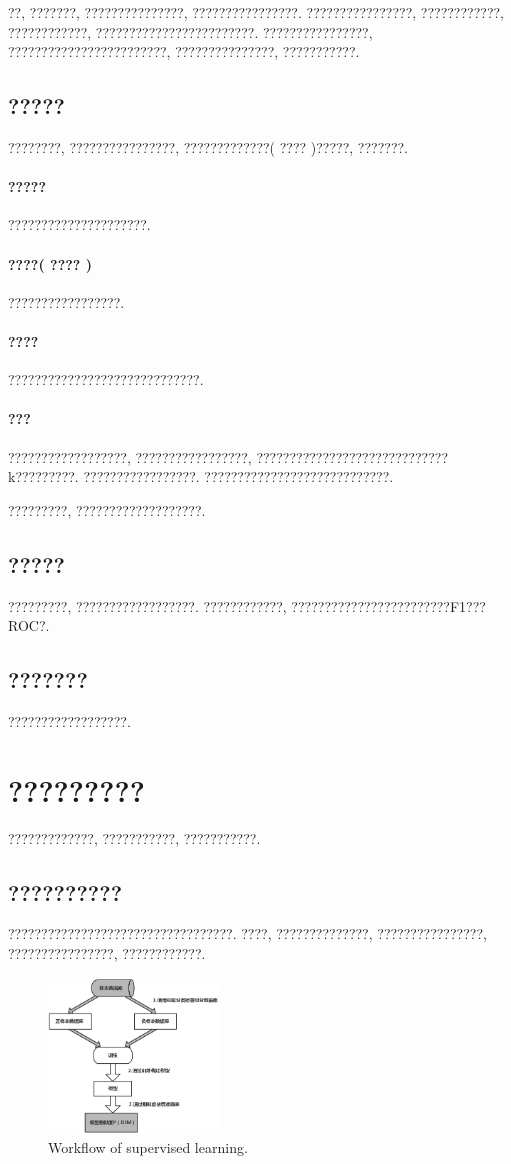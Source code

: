 \documentclass[lang=cn,11pt,a4paper]{elegantpaper}
\begin{document}
??, ???????, ???????????????, ????????????????. ????????????????, ????????????, ????????????, ????????????????????????. ????????????????, ????????????????????????, ???????????????, ???????????. 
\subsection{?????}
????????, ????????????????, ?????????????( ???? )?????, ???????. 
\paragraph{?????}?????????????????????.
\paragraph{????( ???? )}?????????????????.
\paragraph{????}?????????????????????????????. 
\paragraph{???}??????????????????, ?????????????????, ?????????????????????????????k?????????. ?????????????????. ????????????????????????????.

?????????, ???????????????????. 
\subsection{?????}
\par ?????????, ??????????????????. ????????????, ????????????????????????F1???ROC?.
\subsection{???????}
\par ??????????????????.
\section{?????????}
\par ?????????????, ???????????, ???????????.
\subsection{??????????}
??????????????????????????????????. ????, ??????????????, ????????????????, ????????????????, ????????????. 
\begin{figure}[htbp]
	\centering
	\hspace{45pt}\includegraphics[width=0.4\textwidth]{SL}
  	\caption{Workflow of supervised learning.\label{fig:SL}}
\end{figure}
\end{document}
